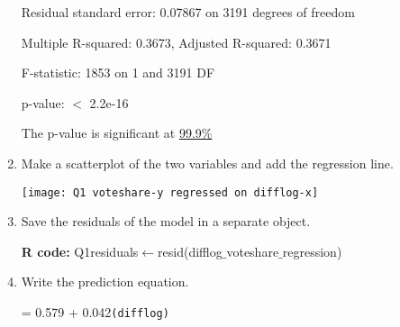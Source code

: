 \documentclass[12pt,letterpaper]{article}
\begin{document}
\begin{enumerate}
		Residual standard error: 0.07867 on 3191 degrees of freedom
		
		Multiple R-squared: 0.3673, Adjusted R-squared: 0.3671 
		
		F-statistic: 1853 on 1 and 3191 DF
		
		p-value: $<$ 2.2e-16
		
		The p-value is significant at \underline{99.9\%}	
		\vspace{1cm}
		\item Make a scatterplot of the two variables and add the regression line. 
		
		\texttt{[image: Q1 voteshare-y regressed on difflog-x]}
		\item Save the residuals of the model in a separate object.
		
		\-\hspace{0.5cm}\textbf{R code:} Q1residuals$\gets$resid(difflog$\_$voteshare$\_$regression)
		\vspace{1cm}
		\item Write the prediction equation.
		
		\-\hspace{0.5cm} = 0.579 + 0.042\texttt{(difflog)}
	\end{enumerate}
	
	\newpage
	
\end{document}
